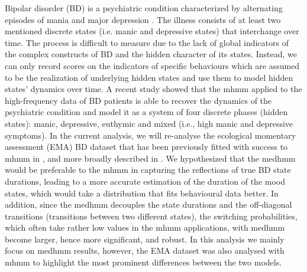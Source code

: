 Bipolar disorder (BD) is a psychiatric condition characterized by alternating episodes of mania and major depression \citep{Kukopulos_Reginaldi_Laddomada_Floris_Serra_Tondo_2008}. The illness consists of at least two mentioned discrete states (i.e. manic and depressive states) that interchange over time. The process is difficult to measure due to the lack of global indicators of the complex constructs of BD and the hidden character of its states. Instead, we can only record scores on the indicators of specific behaviours which are assumed to be the realization of underlying hidden states and use them to model hidden states' dynamics over time. A recent study showed that the \ac{mhmm} applied to the high-frequency data of BD patients is able to recover the dynamics of the psychiatric condition \citep{mildiner_moraga_bos_doornbos_bruggeman_van_2023} and model it as a system of four discrete phases (hidden states): manic, depressive, euthymic and mixed (i.e., high manic and depressive symptoms). In the current analysis, we will re-analyse the ecological momentary assessment (EMA) BD dataset that has been previously fitted with success to \ac{mhmm} in \cite{mildiner_moraga_bos_doornbos_bruggeman_van_2023}, and more broadly described in \citep{Bos_Krieke_2020, Bos_2022}. We hypothesized that the \ac{medhmm} would be preferable to the \ac{mhmm} in capturing the reflections of true BD state durations, leading to a more accurate estimation of the duration of the mood states, which would take a distribution that fits behavioural data better. In addition, since the \ac{medhmm} decouples the state durations and the off-diagonal transitions (transitions between two different states), the switching probabilities, which often take rather low values in the \ac{mhmm} applications, with \ac{medhmm} become larger, hence more significant, and robust. In this analysis we mainly focus on \ac{medhmm} results, however, the EMA dataset was also analysed with \ac{mhmm} to highlight the most prominent differences between the two models.

